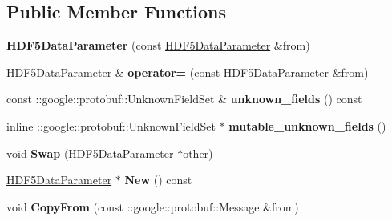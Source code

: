 \subsection*{Public Member Functions}
\begin{DoxyCompactItemize}
\item 
\mbox{\label{classcaffe_1_1_h_d_f5_data_parameter_a2293623f7ee5a6e3eddf5ba1d85a7167}} 
{\bfseries H\+D\+F5\+Data\+Parameter} (const \mbox{\hyperlink{classcaffe_1_1_h_d_f5_data_parameter}{H\+D\+F5\+Data\+Parameter}} \&from)
\item 
\mbox{\label{classcaffe_1_1_h_d_f5_data_parameter_a32b44c77049319d3c9462dbbe1c035d2}} 
\mbox{\hyperlink{classcaffe_1_1_h_d_f5_data_parameter}{H\+D\+F5\+Data\+Parameter}} \& {\bfseries operator=} (const \mbox{\hyperlink{classcaffe_1_1_h_d_f5_data_parameter}{H\+D\+F5\+Data\+Parameter}} \&from)
\item 
\mbox{\label{classcaffe_1_1_h_d_f5_data_parameter_ae8142df8b1c131dd72feabb2b6f55aa2}} 
const \+::google\+::protobuf\+::\+Unknown\+Field\+Set \& {\bfseries unknown\+\_\+fields} () const
\item 
\mbox{\label{classcaffe_1_1_h_d_f5_data_parameter_a88affce8b0da9c58b0a7cda1668a3f1e}} 
inline \+::google\+::protobuf\+::\+Unknown\+Field\+Set $\ast$ {\bfseries mutable\+\_\+unknown\+\_\+fields} ()
\item 
\mbox{\label{classcaffe_1_1_h_d_f5_data_parameter_aa46352d09feb2defaf46d6fe2a24c617}} 
void {\bfseries Swap} (\mbox{\hyperlink{classcaffe_1_1_h_d_f5_data_parameter}{H\+D\+F5\+Data\+Parameter}} $\ast$other)
\item 
\mbox{\label{classcaffe_1_1_h_d_f5_data_parameter_a20f6000dde37c98ca142c0dfd204aee7}} 
\mbox{\hyperlink{classcaffe_1_1_h_d_f5_data_parameter}{H\+D\+F5\+Data\+Parameter}} $\ast$ {\bfseries New} () const
\item 
\mbox{\label{classcaffe_1_1_h_d_f5_data_parameter_a548dfb2912846431ed935ea8a5aa1fbd}} 
void {\bfseries Copy\+From} (const \+::google\+::protobuf\+::\+Message \&from)

\end{DoxyCompactItemize}

